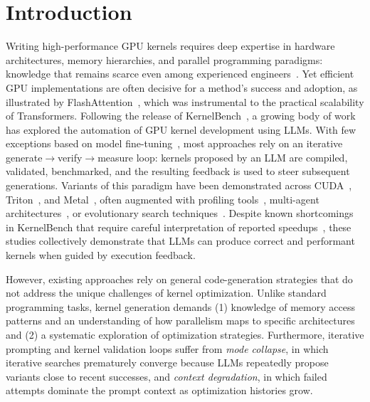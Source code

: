 %
%
%
%

\section{Introduction}
Writing high-performance GPU kernels requires deep expertise in hardware architectures, memory hierarchies, and parallel programming paradigms: knowledge that remains scarce even among experienced engineers~\citep{li2025cuda}. Yet efficient GPU implementations are often decisive for a method's success and adoption, as illustrated by FlashAttention~\citep{dao2022flashattention}, which was instrumental to the practical scalability of Transformers. 
Following the release of KernelBench~\citep{ouyang2025kernelbench}, a growing body of work has explored the automation of GPU kernel development using LLMs. With few exceptions based on model fine-tuning~\citep{li2025cuda, baronio2025kevin}, most approaches rely on an iterative generate$\to$verify$\to$measure loop: kernels proposed by an LLM are compiled, validated, benchmarked, and the resulting feedback is used to steer subsequent generations. Variants of this paradigm have been demonstrated across CUDA~\citep{chen2025cuda, zhang2025cudaforge, lange2025towards}, Triton~\citep{wang2025geak, li2025tritonforge}, and Metal~\citep{gimlet}, often augmented with profiling tools~\citep{zhang2025cudaforge, chen2025cuda, lange2025towards, gimlet}, multi-agent architectures~\citep{wei2025astra, zhang2025cudaforge, lei2025pragma}, or evolutionary search techniques~\citep{liao2025kernelevolve, lange2025ai, yan2026pacevolve}.
Despite known shortcomings in KernelBench that require careful interpretation of reported speedups~\cite{lange2025towards}, these studies collectively demonstrate that LLMs can produce correct and performant kernels when guided by execution feedback. 

However, existing approaches rely on general code-generation strategies that do not address the unique challenges of kernel optimization. Unlike standard programming tasks, kernel generation demands (1) knowledge of memory access patterns and an understanding of how parallelism maps to specific architectures and (2) a systematic exploration of optimization strategies. Furthermore, iterative prompting and kernel validation loops suffer from \textit{mode collapse}, in which iterative searches prematurely converge because LLMs repeatedly propose variants close to recent successes, and \textit{context degradation}, in which failed attempts dominate the prompt context as optimization histories grow.

